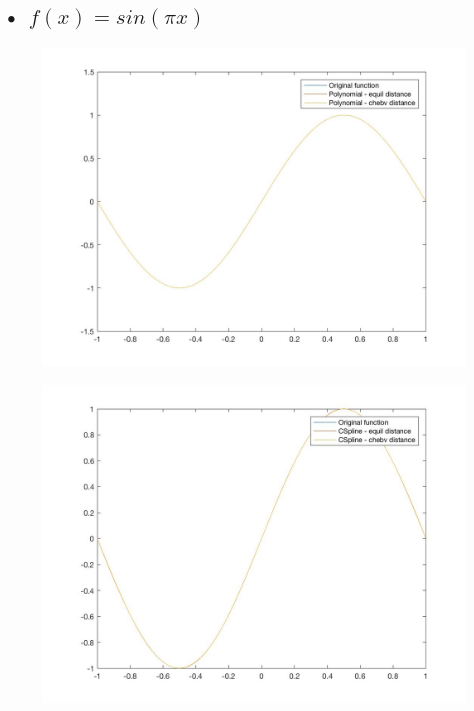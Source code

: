 \documentclass[11pt]{article} %
\begin{document}
\subsection{• $f(x)=sin(\pi x)$}
\begin{figure}[H]
\centering
\begin{minipage}{.5\textwidth}
  \centering
  \includegraphics[width=1.1\linewidth]{e41p.jpg}
  \label{fig:test1}
\end{minipage}%
\begin{minipage}{.5\textwidth}
  \centering
  \includegraphics[width=1.1\linewidth]{e41s.jpg}
  \label{fig:test2}
\end{minipage}
\end{figure}
\end{document}
